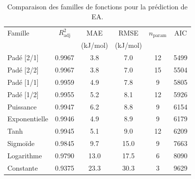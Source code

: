 \begin{table}[htbp]
\centering
\footnotesize
\caption{Comparaison des familles de fonctions pour la prédiction de EA.}
\label{tab:s4_ea_families}
\begin{tabular}{lccccc}
\toprule
Famille & $R^2_{\mathrm{adj}}$ & MAE & RMSE & $n_{\mathrm{param}}$ & AIC \\
 & & (kJ/mol) & (kJ/mol) & & \\
\midrule
Padé [2/1] & 0.9967 & 3.8 & 7.0 & 12 & 5499 \\
Padé [2/2] & 0.9967 & 3.8 & 7.0 & 15 & 5504 \\
Padé [1/1] & 0.9959 & 4.9 & 7.8 & 9 & 5805 \\
Padé [1/2] & 0.9955 & 5.2 & 8.1 & 12 & 5926 \\
Puissance & 0.9947 & 6.2 & 8.8 & 9 & 6154 \\
Exponentielle & 0.9946 & 4.9 & 8.9 & 9 & 6179 \\
Tanh & 0.9945 & 5.1 & 9.0 & 12 & 6209 \\
Sigmoïde & 0.9845 & 9.7 & 15.0 & 9 & 7663 \\
Logarithme & 0.9790 & 13.0 & 17.5 & 6 & 8090 \\
Constante & 0.9375 & 23.3 & 30.3 & 3 & 9629 \\
\bottomrule
\end{tabular}
\end{table}